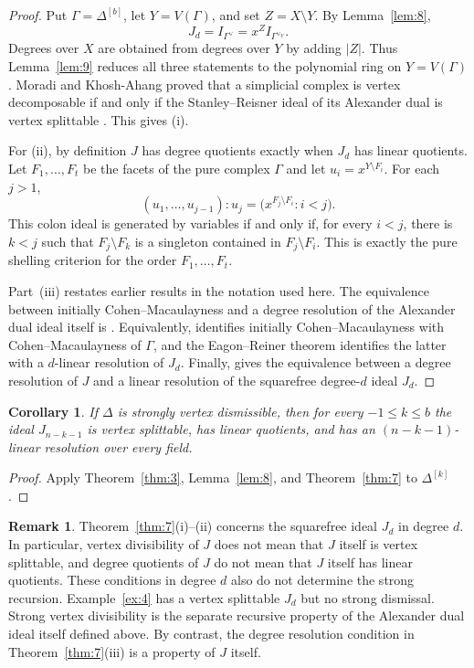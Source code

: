 \documentclass[11pt]{amsart}
\newtheorem{corollary}[theorem]{Corollary}
\theoremstyle{definition}
\newtheorem{remark}[theorem]{Remark}
\begin{document}
	\begin{proof}
		Put $\Gamma=\Delta^{[b]}$, let $Y=V(\Gamma)$, and set $Z=X\setminus Y$. By Lemma~\ref{lem:8},
		\[
		J_d=I_{\Gamma^{\vee}}
		=x^Z I_{\Gamma^{\vee_Y}}.
		\]
		Degrees over $X$ are obtained from degrees over $Y$ by adding $|Z|$.  Thus Lemma~\ref{lem:9} reduces all three statements to the polynomial ring on $Y=V(\Gamma)$.  Moradi and Khosh-Ahang proved that a simplicial complex is vertex decomposable if and only if the Stanley--Reisner ideal of its Alexander dual is vertex splittable \cite[Theorem~2.3]{MoradiKhoshAhang2016}.  This gives (i).
		
		For (ii), by definition $J$ has degree quotients exactly when $J_d$ has linear quotients.  Let $F_1,\dots,F_t$ be the facets of the pure complex $\Gamma$ and let $u_i=x^{Y\setminus F_i}$.  For each $j>1$,
		\[
		(u_1,\dots,u_{j-1}):u_j
		=\bigl(x^{F_j\setminus F_i}:i<j\bigr).
		\]
		This colon ideal is generated by variables if and only if, for every $i<j$, there is $k<j$ such that $F_j\setminus F_k$ is a singleton contained in $F_j\setminus F_i$.  This is exactly the pure shelling criterion for the order $F_1,\dots,F_t$.
		
		Part~(iii) restates earlier results in the notation used here. The equivalence between initially Cohen--Macaulayness and a degree resolution of the Alexander dual ideal itself is \cite[Proposition~4.4]{Namiq2026ICM}. Equivalently, \cite[Proposition~4.6]{Namiq2026ICM} identifies initially Cohen--Macaulayness with Cohen--Macaulayness of $\Gamma$, and the Eagon--Reiner theorem \cite{EagonReiner1998} identifies the latter with a $d$-linear resolution of $J_d$. Finally, \cite[Proposition~3.3]{Namiq2026Skeletons} gives the equivalence between a degree resolution of $J$ and a linear resolution of the squarefree degree-$d$ ideal $J_d$.
	\end{proof}
	
	\begin{corollary}\label{cor:11}
		If $\Delta$ is strongly vertex dismissible, then for every $-1\leq k\leq b$ the ideal $J_{n-k-1}$ is vertex splittable, has linear quotients, and has an $(n-k-1)$-linear resolution over every field.
	\end{corollary}
	
	\begin{proof}
		Apply Theorem~\ref{thm:3}, Lemma~\ref{lem:8}, and Theorem~\ref{thm:7} to $\Delta^{[k]}$.
	\end{proof}
	
	\begin{remark}\label{rem:5}
		Theorem~\ref{thm:7}(i)--(ii) concerns the squarefree ideal $J_d$ in degree $d$. In particular, vertex divisibility of $J$ does not mean that $J$ itself is vertex splittable, and degree quotients of $J$ do not mean that $J$ itself has linear quotients. These conditions in degree $d$ also do not determine the strong recursion.  Example~\ref{ex:4} has a vertex splittable $J_d$ but no strong dismissal.  Strong vertex divisibility is the separate recursive property of the Alexander dual ideal itself defined above. By contrast, the degree resolution condition in Theorem~\ref{thm:7}(iii) is a property of $J$ itself.
	\end{remark}
	
\end{document}
